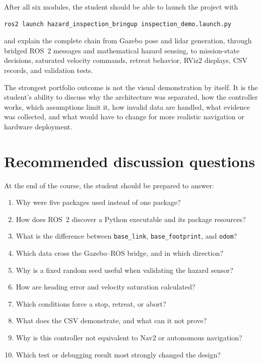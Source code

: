 \documentclass[11pt]{article}
\begin{document}
After all six modules, the student should be able to launch the project with

\begin{verbatim}
ros2 launch hazard_inspection_bringup inspection_demo.launch.py
\end{verbatim}

and explain the complete chain from Gazebo pose and lidar generation, through
bridged ROS~2 messages and mathematical hazard sensing, to mission-state
decisions, saturated velocity commands, retreat behavior, RViz2 displays, CSV
records, and validation tests.

The strongest portfolio outcome is not the visual demonstration by itself. It
is the student's ability to discuss why the architecture was separated, how
the controller works, which assumptions limit it, how invalid data are handled,
what evidence was collected, and what would have to change for more realistic
navigation or hardware deployment.

\section{Recommended discussion questions}

At the end of the course, the student should be prepared to answer:

\begin{enumerate}
  \item Why were five packages used instead of one package?
  \item How does ROS~2 discover a Python executable and its package resources?
  \item What is the difference between \texttt{base\_link},
        \texttt{base\_footprint}, and \texttt{odom}?
  \item Which data cross the Gazebo--ROS bridge, and in which direction?
  \item Why is a fixed random seed useful when validating the hazard sensor?
  \item How are heading error and velocity saturation calculated?
  \item Which conditions force a stop, retreat, or abort?
  \item What does the CSV demonstrate, and what can it not prove?
  \item Why is this controller not equivalent to Nav2 or autonomous navigation?
  \item Which test or debugging result most strongly changed the design?
\end{enumerate}
\end{document}
